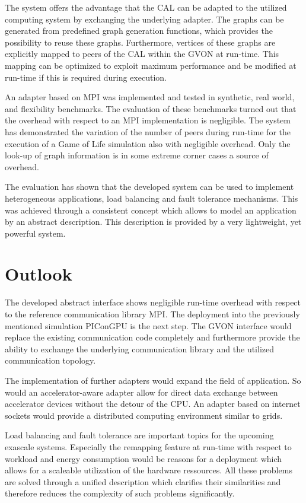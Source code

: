 The system offers the advantage that the CAL can be adapted to the
utilized computing system by exchanging the underlying adapter.  The
graphs can be generated from predefined graph generation functions,
which provides the possibility to reuse these graphs. Furthermore, 
vertices of these graphs are explicitly mapped to peers of the CAL
within the GVON at run-time. This mapping can be optimized to exploit
maximum performance and be modified at run-time if this is required
during execution.

An adapter based on MPI was implemented and tested in synthetic,
real world, and flexibility benchmarks. The evaluation of these
benchmarks turned out that the overhead with respect to an MPI
implementation is negligible.  The system has demonstrated the
variation of the number of peers during run-time for the execution of
a Game of Life simulation also with negligible overhead. Only the
look-up of graph information is in some extreme corner cases a
source of overhead.

The evaluation has shown that the developed system can be used to
implement heterogeneous applications, load balancing and fault
tolerance mechanisms. This was achieved through a consistent concept
which allows to model an application by an abstract description. This
description is provided by a very lightweight, yet powerful system.


\chapter{Outlook}
\label{sec:outlook}


The developed abstract interface shows negligible run-time overhead
with respect to the reference communication library MPI. The
deployment into the previously mentioned simulation PIConGPU is the
next step.  The GVON interface would replace the existing
communication code completely and furthermore provide the ability to
exchange the underlying communication library and the utilized
communication topology.

The implementation of further adapters would expand the field of
application. So would an accelerator-aware adapter allow for direct data
exchange between accelerator devices without the detour of the CPU.
An adapter based on internet sockets would provide a distributed
computing environment similar to grids.

Load balancing and fault tolerance are important topics for the
upcoming exascale systems.  Especially the remapping feature at
run-time with respect to workload and energy consumption would be
reasons for a deployment which allows for a scaleable utilization of
the hardware ressources. All these problems are solved through a
unified description which clarifies their similarities and therefore
reduces the complexity of such problems significantly.

\cleardoublepage

